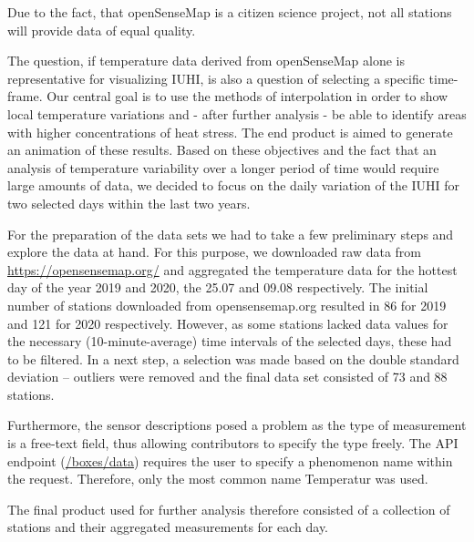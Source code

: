 Due to the fact, that openSenseMap is a citizen science project, not all stations will provide data of equal quality.

The question, if temperature data derived from openSenseMap alone is representative for visualizing IUHI, is also a question of selecting a specific time-frame. Our central goal is to use the methods of interpolation in order to show local temperature variations and - after further analysis - be able to identify areas with higher concentrations of heat stress. The end product is aimed to generate an animation of these results. Based on these objectives and the fact that an analysis of temperature variability over a longer period of time would require large amounts of data, we decided to focus on the daily variation of the IUHI for two selected days within the last two years.

For the preparation of the data sets we had to take a few preliminary steps and explore the data at hand. For this purpose, we downloaded raw data from \url{https://opensensemap.org/} and aggregated the temperature data for the hottest day of the year 2019 and 2020, the 25.07 and 09.08 respectively. The initial number of stations downloaded from opensensemap.org resulted in 86 for 2019 and 121 for 2020 respectively. However, as some stations lacked data values for the necessary (10-minute-average) time intervals of the selected days, these had to be filtered. In a next step, a selection was made based on the double standard deviation – outliers were removed and the final data set consisted of 73 and 88 stations.

Furthermore, the sensor descriptions posed a problem as the type of measurement is a free-text field, thus allowing contributors to specify the type freely. The API endpoint (\url{/boxes/data}) requires the user to specify a phenomenon name within the request. Therefore, only the most common name \ldq{}Temperatur\rdq{} was used.

The final product used for further analysis therefore consisted of a collection of stations and their aggregated measurements for each day.



